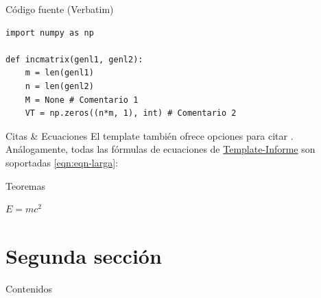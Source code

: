 
\begin{frame}[fragile]{Código fuente (Verbatim)}
	\begin{example}
\begin{verbatim}
import numpy as np

def incmatrix(genl1, genl2):
    m = len(genl1)
    n = len(genl2)
    M = None # Comentario 1
    VT = np.zeros((n*m, 1), int) # Comentario 2
\end{verbatim}
	\end{example}
\end{frame}


\begin{frame}{Citas \& Ecuaciones}
	El template también ofrece opciones para citar \cite{template}. Análogamente, todas las fórmulas de ecuaciones de \href{https://latex.ppizarror.com/informe}{Template-Informe} son soportadas \eqref{eqn:eqn-larga}:
	
\end{frame}


\begin{frame}{Teoremas}
	\begin{theorem}
		$E = mc^2$
	\end{theorem}
\end{frame}


\section{Segunda sección}

\begin{frame}{Contenidos}
	\tableofcontentscurrent
\end{frame}

